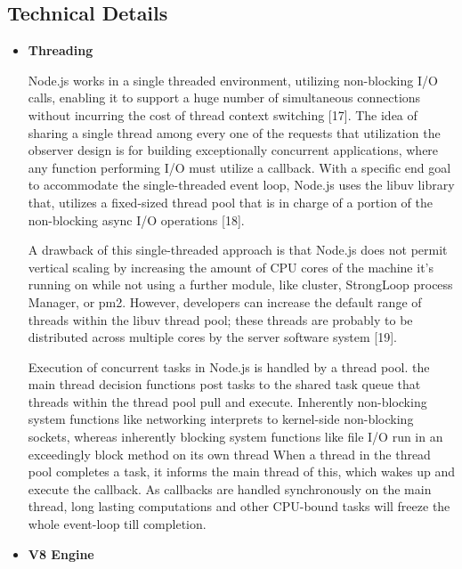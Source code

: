 \documentclass[../thesis.tex]{subfiles}
\begin{document}
\subsection*{Technical Details}
\begin{itemize}
    \item \textbf{Threading}
    \newline
    
    Node.js works in a single threaded environment, utilizing non-blocking I/O calls, enabling it to support a huge number of simultaneous connections without incurring the cost of thread context switching [17]. The idea of sharing a single thread among every one of the requests that utilization the observer design is for building exceptionally concurrent applications, where any function performing I/O must utilize a callback. With a specific end goal to accommodate the single-threaded event loop, Node.js uses the libuv library that, utilizes a fixed-sized thread pool that is in charge of a portion of the non-blocking async I/O operations [18].
    \newline
    
    A drawback of this single-threaded approach is that Node.js does not permit vertical scaling by increasing the amount of CPU cores of the machine it's running on while not using a further module, like cluster, StrongLoop process Manager, or pm2. However, developers can increase the default range of threads within the libuv thread pool; these threads are probably to be distributed across multiple cores by the server software system [19].
    \newline
    
    Execution of concurrent tasks in Node.js is handled by a thread pool. the main thread decision functions post tasks to the shared task queue that threads within the thread pool pull and execute. Inherently non-blocking system functions like networking interprets to kernel-side non-blocking sockets, whereas inherently blocking system functions like file I/O run in an exceedingly block method on its own thread When a thread in the thread pool completes a task, it informs the main thread of this, which wakes up and execute the callback. As callbacks are handled synchronously on the main thread, long lasting computations and other CPU-bound tasks will freeze the whole event-loop till completion.
    \newline
    
    \item \textbf{V8 Engine}
    \newline
    

\end{itemize}
\end{document}
